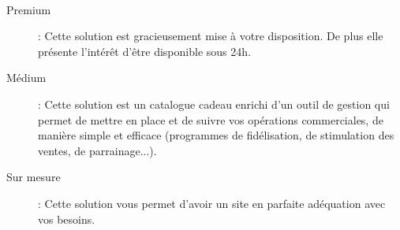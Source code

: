 \paragraph{}
\begin{description}
\item [Premium]: Cette solution est gracieusement mise à votre disposition. 
De plus elle présente l'intérêt d'être disponible sous 24h. 
\item [Médium]: Cette solution est un catalogue cadeau enrichi d'un outil de gestion qui permet de mettre en place et de suivre vos opérations commerciales, de manière simple et efficace (programmes de fidélisation, de stimulation des ventes, de parrainage...).
\item [Sur mesure]: Cette solution vous permet d'avoir un site en parfaite adéquation avec vos besoins.
\end{description}




